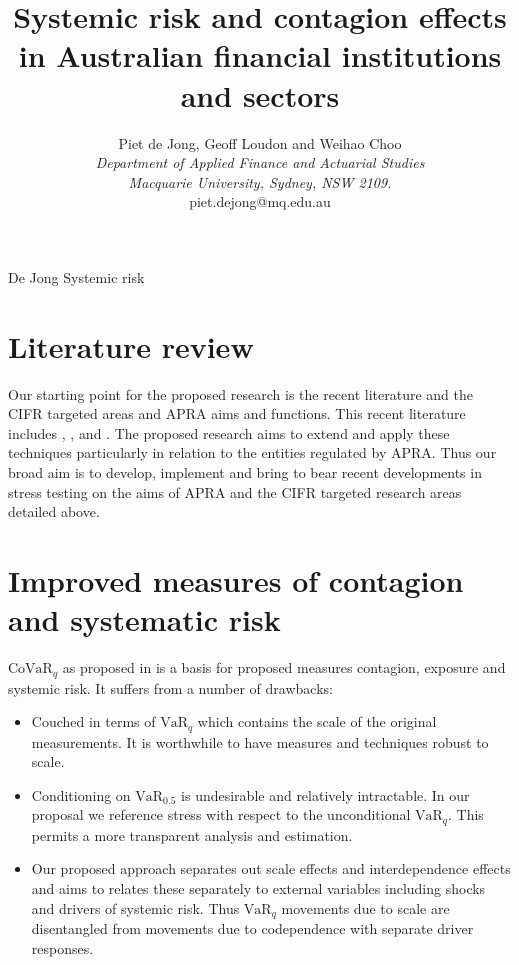 \documentclass[authoryear]{elsarticle}
\newcommand{\bi}{\begin{itemize}}
\newcommand{\ei}{\end{itemize}}
\renewcommand{\i}{\item}
\newcommand{\var}{\ensuremath{\mathrm{VaR}}}
\newcommand{\covar}{\ensuremath{\mathrm{CoVaR}}}
\renewcommand{\v}{\ensuremath{\mathrm{v}_q}}
\begin{document}
\title{Systemic risk and contagion effects in Australian financial institutions and sectors}
\author{Piet de Jong,  Geoff Loudon and Weihao Choo \\[4pt]
\textit{Department of Applied Finance and Actuarial Studies\\ Macquarie University, Sydney, NSW 2109.}
\\[2pt]
{piet.dejong@mq.edu.au}}

\markboth%
{De Jong}
{Systemic risk}

\maketitle

\section{Literature review}

Our starting point for the proposed research is the recent literature and the CIFR targeted areas and APRA aims and functions.
This recent literature includes
\cite{adrian2011covar},
\cite{acharya2012capital},
\cite{acharya2012measuring}
and \cite{brownlees2010volatility}.   The proposed research aims to extend and apply these techniques particularly in relation to the entities regulated by APRA.   Thus our  broad aim is to develop, implement and bring to bear recent developments in stress testing  on the aims of APRA and the CIFR targeted research areas detailed above.   

\section{Improved  measures of contagion and systematic risk}
\renewcommand{\c}{\ensuremath{\mathrm{CoVaR_q}}}
\renewcommand{\v}{\ensuremath{\mathrm{VaR}_q}}

$\covar_q$ as proposed in \cite{adrian2011covar} is a basis for proposed measures contagion, exposure and systemic risk.   It  suffers from a number of drawbacks:
\bi
\i Couched in terms of $\var_q$ which contains the scale of the original measurements.   It is worthwhile to have measures and techniques robust to scale.
\i  Conditioning  on $\var_{0.5}$ is undesirable and relatively intractable.  In our proposal we reference stress with respect  to the unconditional $\var_q$.   This permits a more transparent analysis and estimation. 
\i  Our proposed approach  separates out scale effects and interdependence effects and aims to  relates these separately to external variables including shocks and drivers of systemic risk.   Thus $\var_q$ movements due to scale are disentangled from movements due to codependence with separate driver responses.
\ei
\end{document}
